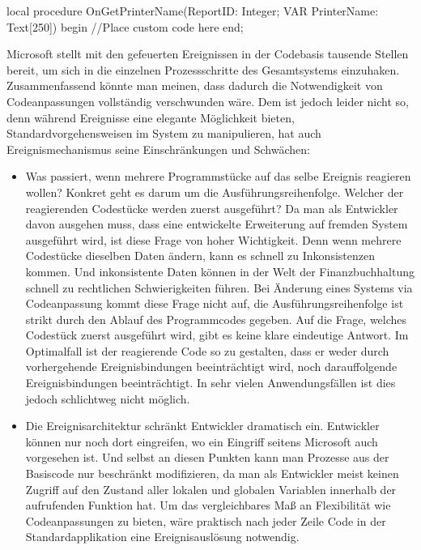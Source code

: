 \begin{program}[H]  %
	\begin{JavaCode}
  local procedure OnGetPrinterName(ReportID: Integer; VAR PrinterName: Text[250])
  begin
    //Place custom code here
  end;
	\end{JavaCode}
\end{program}

Microsoft stellt mit den gefeuerten Ereignissen in der Codebasis tausende Stellen bereit, um sich in die einzelnen Prozessschritte des Gesamtsystems einzuhaken. Zusammenfassend könnte man meinen, dass dadurch die Notwendigkeit von Codeanpassungen vollständig verschwunden wäre. Dem ist jedoch leider nicht so, denn während Ereignisse eine elegante Möglichkeit bieten, Standardvorgehensweisen im System zu manipulieren, hat auch Ereignismechanismus seine Einschränkungen und Schwächen:

\begin{itemize}
	\item Was passiert, wenn mehrere Programmstücke auf das selbe Ereignis reagieren wollen? Konkret geht es darum um die Ausführungsreihenfolge. Welcher der reagierenden Codestücke werden zuerst ausgeführt? Da man als Entwickler davon ausgehen muss, dass eine entwickelte Erweiterung auf fremden System ausgeführt wird, ist diese Frage von hoher Wichtigkeit. Denn wenn mehrere Codestücke dieselben Daten ändern, kann es schnell zu Inkonsistenzen kommen. Und inkonsistente Daten können in der Welt der Finanzbuchhaltung schnell zu rechtlichen Schwierigkeiten führen. Bei Änderung eines Systems via Codeanpassung kommt diese Frage nicht auf, die Ausführungsreihenfolge ist strikt durch den Ablauf des Programmcodes gegeben. Auf die Frage, welches Codestück zuerst ausgeführt wird, gibt es keine klare eindeutige Antwort. Im Optimalfall ist der reagierende Code so zu gestalten, dass er weder durch vorhergehende Ereignisbindungen beeinträchtigt wird, noch darauffolgende Ereignisbindungen beeinträchtigt. In sehr vielen Anwendungsfällen ist dies jedoch schlichtweg nicht möglich.
	\item Die Ereignisarchitektur schränkt Entwickler dramatisch ein. Entwickler können nur noch dort eingreifen, wo ein Eingriff seitens Microsoft auch vorgesehen ist. Und selbst an diesen Punkten kann man Prozesse aus der Basiscode nur beschränkt modifizieren, da man als Entwickler meist keinen Zugriff auf den Zustand aller lokalen und globalen Variablen innerhalb der aufrufenden Funktion hat. Um das vergleichbares Maß an Flexibilität wie Codeanpassungen zu bieten, wäre praktisch nach jeder Zeile Code in der Standardapplikation eine Ereignisauslösung notwendig.
\end{itemize}

